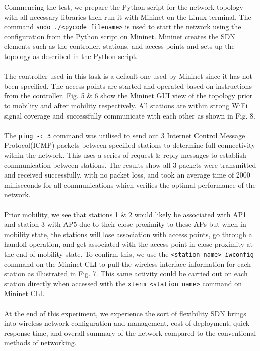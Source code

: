 \documentclass{article}
\begin{document}
Commencing the test, we prepare the Python script for the network topology with all necessary libraries then run it with Mininet on the Linux terminal. The command \texttt{sudo ./<pycode filename>} is used to start the network using the configuration from the Python script on Mininet. Mininet creates the SDN elements such as the controller, stations, and access points and sets up the topology as described in the Python script. \\\\ The controller used in this task is a default one used by Mininet since it has not been specified. The access points are started and operated based on instructions from the controller. Fig. 5 \& 6 show the Mininet GUI view of the topology prior to mobility and after mobility respectively. All stations are within strong WiFi signal coverage and successfully communicate with each other as shown in Fig. 8. \\\\ The \texttt{ping -c 3} command was utilised to send out 3 Internet Control Message Protocol(ICMP) \citep{1010101} packets between specified stations to determine full connectivity within the network. This uses a series of request \& reply messages to establish communication between stations. The results show all 3 packets were transmitted and received successfully, with no packet loss, and took an average time of 2000 milliseconds for all communications which verifies the optimal performance of the network. \\\\ Prior mobility, we see that stations 1 \& 2 would likely be associated with AP1 and station 3 with AP5 due to their close proximity to these APs but when in mobility state, the stations will lose association with access points, go through a handoff operation, and get associated with the access point in close proximity at the end of mobility state. To confirm this, we use the \texttt{<station name> iwconfig} command on the Mininet CLI to pull the wireless interface information for each station as illustrated in Fig. 7. This same activity could be carried out on each station directly when accessed with the \texttt{xterm <station name>} command on Mininet CLI. \\\\ At the end of this experiment, we experience the sort of flexibility SDN brings into wireless network configuration and management, cost of deployment,  quick response time, and overall summary of the network compared to the conventional methods of networking.
\end{document}
